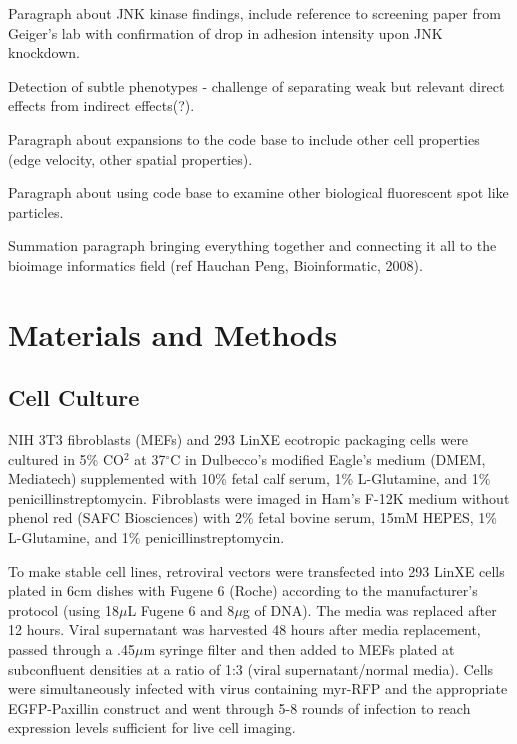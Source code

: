 \documentclass[10pt]{article}
\begin{document}
Paragraph about JNK kinase findings, include reference to screening paper from
Geiger's lab with confirmation of drop in adhesion intensity upon JNK
knockdown.


Detection of subtle phenotypes - challenge of separating weak but relevant
direct effects from indirect effects(?). 

Paragraph about expansions to the code base to include other cell properties
(edge velocity, other spatial properties).

Paragraph about using code base to examine other biological fluorescent spot
like particles.

Summation paragraph bringing everything together and connecting it all to the
bioimage informatics field (ref Hauchan Peng, Bioinformatic, 2008). 



\section*{Materials and Methods}

\subsection*{Cell Culture}

NIH 3T3 fibroblasts (MEFs) and 293 LinXE ecotropic packaging cells were cultured
in 5\% CO$^2$ at 37$^\circ$C in Dulbecco's modified Eagle's medium (DMEM, Mediatech)
supplemented with 10\% fetal calf serum, 1\% L-Glutamine, and 1\%
penicillinstreptomycin. Fibroblasts were imaged in Ham's F-12K medium without
phenol red (SAFC Biosciences) with 2\% fetal bovine serum, 15mM HEPES, 1\%
L-Glutamine, and 1\% penicillinstreptomycin. 

To make stable cell lines, retroviral vectors were transfected into 293 LinXE
cells plated in 6cm dishes with Fugene 6 (Roche) according to the manufacturer's
protocol (using 18$\mu$L Fugene 6 and 8$\mu$g of DNA). The media was replaced
after 12 hours. Viral supernatant was harvested 48 hours after media
replacement, passed through a .45$\mu$m syringe filter and then added to MEFs
plated at subconfluent densities at a ratio of 1:3 (viral supernatant/normal
media). Cells were simultaneously infected with virus containing myr-RFP and
the appropriate EGFP-Paxillin construct and went through 5-8 rounds of infection
to reach expression levels sufficient for live cell imaging.
\end{document}
